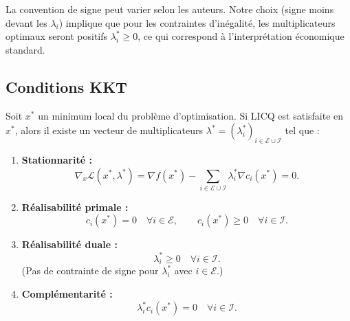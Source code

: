 \begin{remarque}
    La convention de signe peut varier selon les auteurs. Notre choix (signe moins devant les $\lambda_i$) implique que pour les contraintes d'inégalité, les multiplicateurs optimaux seront positifs $\lambda_i^* \geq 0$, ce qui correspond à l'interprétation économique standard.
\end{remarque}

\subsection{Conditions KKT}

\begin{theoreme}
    Soit $x^*$ un minimum local du problème d'optimisation. Si LICQ est satisfaite en $x^*$, alors il existe un vecteur de multiplicateurs $\lambda^* = (\lambda_i^*)_{i \in \mathcal{E} \cup \mathcal{I}}$ tel que :
    \begin{enumerate}
        \item \textbf{Stationnarité :} 
        \begin{equation}
            \nabla_x \mathcal{L}(x^*, \lambda^*) = \nabla f(x^*) - \sum_{i \in \mathcal{E} \cup \mathcal{I}} \lambda_i^* \nabla c_i(x^*) = 0.
        \end{equation}
        
        \item \textbf{Réalisabilité primale :}
        \begin{equation}
            c_i(x^*) = 0 \quad \forall i \in \mathcal{E}, \qquad c_i(x^*) \geq 0 \quad \forall i \in \mathcal{I}.
        \end{equation}
        
        \item \textbf{Réalisabilité duale :}
        \begin{equation}
            \lambda_i^* \geq 0 \quad \forall i \in \mathcal{I}.
        \end{equation}
        (Pas de contrainte de signe pour $\lambda_i^*$ avec $i \in \mathcal{E}$.)
        
        \item \textbf{Complémentarité :}
        \begin{equation}
            \lambda_i^* c_i(x^*) = 0 \quad \forall i \in \mathcal{I}.
        \end{equation}
    \end{enumerate}
\end{theoreme}

